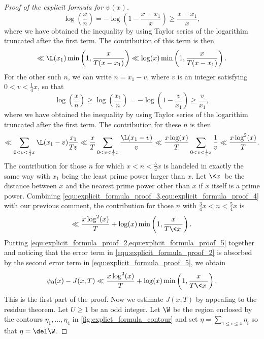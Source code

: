 \begin{proof}[Proof of the explicit formula for $\psi(x)$]
        \[
          \log\left(\frac{x}{n}\right) = -\log\left(1-\frac{x-x_{1}}{x}\right) \ge \frac{x-x_{1}}{x},
        \]
        where we have obtained the inequality by using Taylor series of the logarithim truncated after the first term. The contribution of this term is then
        \begin{equation}\label{equ:explicit_formula_proof_3}
          \ll \L(x_{1})\min\left(1,\frac{x}{T(x-x_{1})}\right) \ll \log(x)\min\left(1,\frac{x}{T(x-x_{1})}\right).
        \end{equation}
        For the other such $n$, we can write $n = x_{1}-v$, where $v$ is an integer satisfying $0 < v < \frac{1}{4}x$, so that
        \[
          \log\left(\frac{x}{n}\right) \ge \log\left(\frac{x_{1}}{n}\right) = -\log\left(1-\frac{v}{x_{1}}\right) \ge \frac{v}{x_{1}},
        \]
        where we have obtained the inequality by using Taylor series of the logarithim truncated after the first term. The contribution for these $n$ is then
        \begin{equation}\label{equ:explicit_formula_proof_4}
          \ll \sum_{0 < v < \frac{1}{4}x}\L(x_{1}-v)\frac{x_{1}}{Tv} \ll \frac{x}{T}\sum_{0 < v < \frac{1}{4}x}\frac{\L(x_{1}-v)}{v} \ll \frac{x\log(x)}{T}\sum_{0 < v < \frac{1}{4}x}\frac{1}{v} \ll \frac{x\log^{2}(x)}{T}.
        \end{equation}
        The contribution for those $n$ for which $x < n < \frac{5}{4}x$ is handeled in exactly the same way with $x_{1}$ being the least prime power larger than $x$. Let $\<x\>$ be the distance between $x$ and the nearest prime power other than $x$ if $x$ itself is a prime power. Combining \cref{equ:explicit_formula_proof_3,equ:explicit_formula_proof_4} with our previous comment, the contribution for those $n$ with $\frac{3}{4}x < n < \frac{5}{4}x$ is
        \begin{equation}\label{equ:explicit_formula_proof_5}
          \ll \frac{x\log^{2}(x)}{T}+\log(x)\min\left(1,\frac{x}{T\<x\>}\right).
        \end{equation}
        Putting \cref{equ:explicit_formula_proof_2,equ:explicit_formula_proof_5} together and noticing that the error term in \cref{equ:explicit_formula_proof_2} is absorbed by the second error term in \cref{equ:explicit_formula_proof_5}, we obtain
        \begin{equation}\label{equ:explicit_formula_proof_6}
          \psi_{0}(x)-J(x,T) \ll \frac{x\log^{2}(x)}{T}+\log(x)\min\left(1,\frac{x}{T\<x\>}\right).
        \end{equation}
        This is the first part of the proof. Now we estimate $J(x,T)$ by appealing to the residue theorem. Let $U \ge 1$ be an odd integer. Let $\W$ be the region enclosed by the contours $\eta_{1},\ldots,\eta_{4}$ in \cref{fig:explict_formula_contour} and set $\eta = \sum_{1 \le i \le 4}\eta_{i}$ so that $\eta = \del \W$.


\end{proof}
